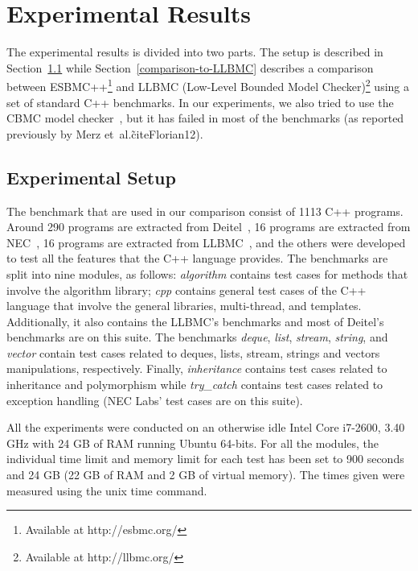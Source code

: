 \documentclass[a4paper]{llncs}
\begin{document}
\section{Experimental Results}

The experimental results is divided into two parts.
The setup is described in Section~\ref{experimental-setup}
while Section~\ref{comparison-to-LLBMC} describes a comparison
between ESBMC++\footnote{Available at http://esbmc.org/} and
LLBMC (Low-Level Bounded Model Checker)\footnote{Available at http://llbmc.org/}
using a set of standard C++ benchmarks. In our experiments, we also tried to
use the CBMC model checker~\cite{Clarke04}, but it has failed in most of the
benchmarks (as reported previously by Merz et~al.\~cite{Florian12}).

\subsection{Experimental Setup}
\label{experimental-setup}

The benchmark that are used in our comparison consist of 1113 C++ programs.
Around 290 programs are extracted from Deitel~\cite{Deitel},
16 programs are extracted from NEC~\cite{NeclabsBenchmarkExceptions},
16 programs are extracted from LLBMC~\cite{PrabhuMBIG11},
and the others were developed to test all the features that the C++ language
provides. The benchmarks are split into nine modules, as follows:
\textit{algorithm} contains test cases for methods that involve the
algorithm library; \textit{cpp} contains general test cases of the C++
language that involve the general libraries, multi-thread, and templates.
Additionally, it also contains the LLBMC's benchmarks and most of Deitel's
benchmarks are on this suite. The benchmarks \textit{deque}, \textit{list},
\textit{stream}, \textit{string}, and \textit{vector} contain test cases
related to deques, lists, stream, strings and vectors manipulations, respectively.
Finally, \textit{inheritance} contains test cases related to inheritance and
polymorphism while \textit{try\_catch} contains test cases related to exception handling
(NEC Labs' test cases are on this suite).

All the experiments were conducted on an otherwise idle Intel Core i7-2600,
3.40 GHz with 24 GB of RAM running Ubuntu 64-bits. For all the modules,
the individual time limit and memory limit for each test has been set to 900 seconds
and 24 GB (22 GB of RAM and 2 GB of virtual memory). The times given were measured
using the unix time command.
\end{document}
